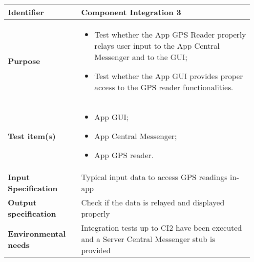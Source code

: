 
\begin{center}
\begin{tabular}{lp{}}
\toprule
\textbf{Identifier}		&	Component Integration 3\\
\midrule
\textbf{Purpose}		&	\begin{itemize}
					\item Test whether the App GPS Reader properly relays user input to the App Central Messenger and to the GUI;
					\item Test whether the App GUI provides proper access to the GPS reader functionalities.
					\end{itemize}	\\
\textbf{Test item(s)}	&	\begin{itemize}
					\item App GUI;
					\item App Central Messenger;
					\item App GPS reader.
					\end{itemize}	\\
\textbf{Input Specification}	&	Typical input data to access GPS readings in-app\\
\textbf{Output specification}	&	Check if the data is relayed and displayed properly\\
\textbf{Environmental needs}	&	Integration tests up to CI2 have been executed and a Server Central Messenger stub is provided\\
\bottomrule
\end{tabular}
\end{center}


